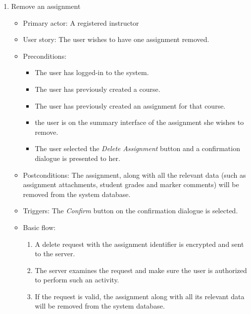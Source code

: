 \begin{enumerate}
\item Remove an assignment
\begin{itemize}
    \item Primary actor: A registered instructor
    \item User story: The user wishes to have one assignment removed.
    \item Preconditions:
        \begin{itemize}
            \item The user has logged-in to the system.
            \item The user has previously created a course.
            \item The user has previously created an assignment for that course.
            \item the user is on the summary interface of the assignment she
                wishes to remove.
            \item The user selected the \emph{Delete Assignment} button and a
                confirmation dialogue is presented to her.
        \end{itemize}
    \item Postconditions:
        The assignment, along with all the relevant data (such as assignment
        attachments, student grades and marker comments) will be removed from
        the system database.
    \item Triggers: The \emph{Confirm} button on the confirmation dialogue is
        selected.
    \item Basic flow:
        \begin{enumerate}
            \item A delete request with the assignment identifier is encrypted
                and sent to the server.
            \item The server examines the request and make sure the user is
                authorized to perform such an activity.
            \item If the request is valid, the assignment along with all its
                relevant data will be removed from the system database.
        \end{enumerate}
\end{itemize}


\end{enumerate}

